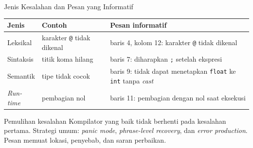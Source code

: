 \documentclass[aspectratio=169,10pt,t]{beamer}
\begin{document}
\begin{frame}{Jenis Kesalahan dan Pesan yang Informatif}
  \small
  \begin{tabular}{@{}p{2.6cm}p{4.4cm}p{6.6cm}@{}}
    \toprule
    \textbf{Jenis} & \textbf{Contoh} & \textbf{Pesan informatif} \\
    \midrule
    Leksikal & karakter \texttt{@} tidak dikenal & baris 4, kolom 12: karakter \texttt{@} tidak dikenal \\
    Sintaksis & titik koma hilang & baris 7: diharapkan \texttt{;} setelah ekspresi \\
    Semantik & tipe tidak cocok & baris 9: tidak dapat menetapkan \texttt{float} ke \texttt{int} tanpa \textit{cast} \\
    \textit{Run-time} & pembagian nol & baris 11: pembagian dengan nol saat eksekusi \\
    \bottomrule
  \end{tabular}

  \vspace{5pt}
  \begin{block}{Pemulihan kesalahan}
    \footnotesize
    Kompilator yang baik tidak berhenti pada kesalahan pertama. Strategi
    umum: \textit{panic mode}, \textit{phrase-level recovery}, dan
    \textit{error production}. Pesan memuat lokasi, penyebab, dan saran
    perbaikan.
  \end{block}
\end{frame}
\end{document}
